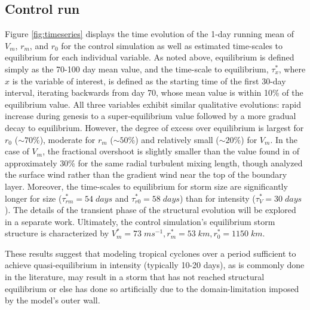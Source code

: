 \documentclass[12pt]{article}
\begin{document}
\subsection{Control run}
Figure \ref{fig:timeseries} displays the time evolution of the 1-day running mean of $V_m$, $r_m$, and $r_0$ for the control simulation as well as estimated time-scales to equilibrium for each individual variable.  As noted above, equilibrium is defined simply as the 70-100 day mean value, and the time-scale to equilibrium, $\tau^*_x$, where $x$ is the variable of interest, is defined as the starting time of the first 30-day interval, iterating backwards from day 70, whose mean value is within 10\% of the equilibrium value.  All three variables exhibit similar qualitative evolutions: rapid increase during genesis to a super-equilibrium value followed by a more gradual decay to equilibrium.  However, the degree of excess over equilibrium is largest for $r_0$ ($\sim 70\%$), moderate for $r_m$ ($\sim 50\%$) and relatively small ($\sim 20\%$) for $V_m$. In the case of $V_m$, the fractional overshoot is slightly smaller than the value found in \cite{Hakim_2011} of approximately 30\% for the same radial turbulent mixing length, though \cite{Hakim_2011} analyzed the surface wind rather than the gradient wind near the top of the boundary layer.  Moreover, the time-scales to equilibrium for storm size are significantly longer for size ($\tau^*_{rm} = 54 \; days$ and $\tau^*_{r0} = 58 \; days$) than for intensity ($\tau^*_V = 30 \; days$).  The details of the transient phase of the structural evolution will be explored in a separate work.  Ultimately, the control simulation's equilibrium storm structure is characterized by $V^*_m = 73 \; ms^{-1}, r^*_m = 53 \; km, r^*_0 = 1150 \; km$.

These results suggest that modeling tropical cyclones over a period sufficient to achieve quasi-equilibrium in intensity (typically 10-20 days), as is commonly done in the literature, may result in a storm that has not reached structural equilibrium or else has done so artificially due to the domain-limitation imposed by the model's outer wall.

\end{document}
